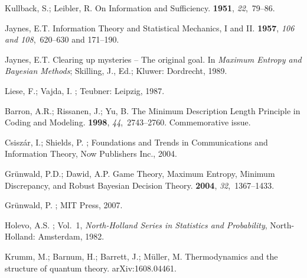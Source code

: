 \documentclass[10pt,a4paper,draft]{article}
\begin{document}
\begin{thebibliography}{-------}
\providecommand{\natexlab}[1]{#1}

Kullback, S.; Leibler, R.
\newblock On Information and Sufficiency.
 {\bf 1951}, {\em 22},~79--86.

Jaynes, E.T.
\newblock Information Theory and Statistical Mechanics, {I} and {II}.
 {\bf 1957}, {\em 106 and 108},~620--630 and
  171--190.

Jaynes, E.T.
\newblock Clearing up mysteries -- The original goal. In {\em Maximum Entropy
  and {B}ayesian Methods}; Skilling, J., Ed.; Kluwer: Dordrecht,  1989.

Liese, F.; Vajda, I.
; Teubner: Leipzig,  1987.

Barron, A.R.; Rissanen, J.; Yu, B.
\newblock The Minimum Description Length Principle in Coding and Modeling.
 {\bf 1998}, {\em 44},~2743--2760.
\newblock Commemorative issue.

Csisz{\'a}r, I.; Shields, P.
; Foundations and
  Trends in Communications and Information Theory, Now Publishers Inc.,  2004.

Gr{\"u}nwald, P.D.; Dawid, A.P.
\newblock Game Theory, Maximum Entropy, Minimum Discrepancy, and Robust
  {B}ayesian Decision Theory.
 {\bf 2004}, {\em
  32},~1367--1433.

Gr{\"u}nwald, P.
; MIT Press,  2007.

Holevo, A.S.
;
  Vol.~1, {\em North-Holland Series in Statistics and Probability},
  North-Holland: Amsterdam,  1982.

Krumm, M.; Barnum, H.; Barrett, J.; M{\"u}ller, M.
\newblock Thermodynamics and the structure of quantum theory.
\newblock arXiv:1608.04461.


\end{thebibliography}
\end{document}
